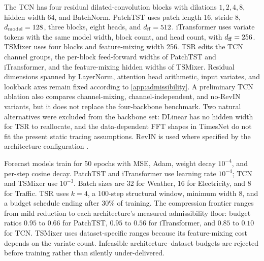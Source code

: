 \documentclass[10pt]{article}
\theoremstyle{paper}
\begin{document}
The TCN has four residual dilated-convolution blocks with dilations $1,2,4,8$, hidden width 64, and BatchNorm. PatchTST uses patch length 16, stride 8, $d_{\rm model}=128$, three blocks, eight heads, and $d_{\rm ff}=512$. iTransformer uses variate tokens with the same model width, block count, and head count, with $d_{\rm ff}=256$. TSMixer uses four blocks and feature-mixing width 256. TSR edits the TCN channel groups, the per-block feed-forward widths of PatchTST and iTransformer, and the feature-mixing hidden widths of TSMixer. Residual dimensions spanned by LayerNorm, attention head arithmetic, input variates, and lookback axes remain fixed according to \cref{app:admissibility}. A preliminary TCN ablation also compares channel-mixing, channel-independent, and no-RevIN variants, but it does not replace the four-backbone benchmark. Two natural alternatives were excluded from the backbone set: DLinear \citep{zeng2023transformers} has no hidden width for TSR to reallocate, and the data-dependent FFT shapes in TimesNet \citep{wu2023timesnet} do not fit the present static tracing assumptions. RevIN is used where specified by the architecture configuration \citep{kim2021reversible}.

Forecast models train for 50 epochs with MSE, Adam, weight decay $10^{-4}$, and per-step cosine decay. PatchTST and iTransformer use learning rate $10^{-4}$; TCN and TSMixer use $10^{-3}$. Batch sizes are 32 for Weather, 16 for Electricity, and 8 for Traffic. TSR uses $k=4$, a 100-step structural window, minimum width 8, and a budget schedule ending after $30\%$ of training. The compression frontier ranges from mild reduction to each architecture's measured admissibility floor: budget ratios $0.95$ to $0.66$ for PatchTST, $0.95$ to $0.56$ for iTransformer, and $0.85$ to $0.10$ for TCN. TSMixer uses dataset-specific ranges because its feature-mixing cost depends on the variate count. Infeasible architecture--dataset budgets are rejected before training rather than silently under-delivered.
\end{document}
